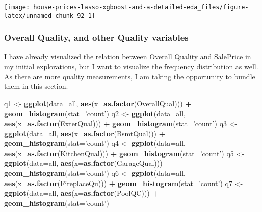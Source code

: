 \documentclass[]{article}
\newenvironment{Shaded}{\begin{snugshade}}{\end{snugshade}}
\newcommand{\KeywordTok}[1]{\textcolor[rgb]{0.13,0.29,0.53}{\textbf{#1}}}
\newcommand{\DataTypeTok}[1]{\textcolor[rgb]{0.13,0.29,0.53}{#1}}
\newcommand{\StringTok}[1]{\textcolor[rgb]{0.31,0.60,0.02}{#1}}
\newcommand{\OperatorTok}[1]{\textcolor[rgb]{0.81,0.36,0.00}{\textbf{#1}}}
\newcommand{\NormalTok}[1]{#1}
\begin{document}
\texttt{[image: house-prices-lasso-xgboost-and-a-detailed-eda\_files/figure-latex/unnamed-chunk-92-1]}

\subsubsection{Overall Quality, and other Quality
variables}\label{overall-quality-and-other-quality-variables}

I have already visualized the relation between Overall Quality and
SalePrice in my initial explorations, but I want to visualize the
frequency distribution as well. As there are more quality measurements,
I am taking the opportunity to bundle them in this section.

\begin{Shaded}
\begin{Highlighting}[]
\NormalTok{q1 <-}\StringTok{ }\KeywordTok{ggplot}\NormalTok{(}\DataTypeTok{data=}\NormalTok{all, }\KeywordTok{aes}\NormalTok{(}\DataTypeTok{x=}\KeywordTok{as.factor}\NormalTok{(OverallQual))) }\OperatorTok{+}
\StringTok{        }\KeywordTok{geom_histogram}\NormalTok{(}\DataTypeTok{stat=}\StringTok{'count'}\NormalTok{)}
\NormalTok{q2 <-}\StringTok{ }\KeywordTok{ggplot}\NormalTok{(}\DataTypeTok{data=}\NormalTok{all, }\KeywordTok{aes}\NormalTok{(}\DataTypeTok{x=}\KeywordTok{as.factor}\NormalTok{(ExterQual))) }\OperatorTok{+}
\StringTok{        }\KeywordTok{geom_histogram}\NormalTok{(}\DataTypeTok{stat=}\StringTok{'count'}\NormalTok{)}
\NormalTok{q3 <-}\StringTok{ }\KeywordTok{ggplot}\NormalTok{(}\DataTypeTok{data=}\NormalTok{all, }\KeywordTok{aes}\NormalTok{(}\DataTypeTok{x=}\KeywordTok{as.factor}\NormalTok{(BsmtQual))) }\OperatorTok{+}
\StringTok{        }\KeywordTok{geom_histogram}\NormalTok{(}\DataTypeTok{stat=}\StringTok{'count'}\NormalTok{)}
\NormalTok{q4 <-}\StringTok{ }\KeywordTok{ggplot}\NormalTok{(}\DataTypeTok{data=}\NormalTok{all, }\KeywordTok{aes}\NormalTok{(}\DataTypeTok{x=}\KeywordTok{as.factor}\NormalTok{(KitchenQual))) }\OperatorTok{+}
\StringTok{        }\KeywordTok{geom_histogram}\NormalTok{(}\DataTypeTok{stat=}\StringTok{'count'}\NormalTok{)}
\NormalTok{q5 <-}\StringTok{ }\KeywordTok{ggplot}\NormalTok{(}\DataTypeTok{data=}\NormalTok{all, }\KeywordTok{aes}\NormalTok{(}\DataTypeTok{x=}\KeywordTok{as.factor}\NormalTok{(GarageQual))) }\OperatorTok{+}
\StringTok{        }\KeywordTok{geom_histogram}\NormalTok{(}\DataTypeTok{stat=}\StringTok{'count'}\NormalTok{)}
\NormalTok{q6 <-}\StringTok{ }\KeywordTok{ggplot}\NormalTok{(}\DataTypeTok{data=}\NormalTok{all, }\KeywordTok{aes}\NormalTok{(}\DataTypeTok{x=}\KeywordTok{as.factor}\NormalTok{(FireplaceQu))) }\OperatorTok{+}
\StringTok{        }\KeywordTok{geom_histogram}\NormalTok{(}\DataTypeTok{stat=}\StringTok{'count'}\NormalTok{)}
\NormalTok{q7 <-}\StringTok{ }\KeywordTok{ggplot}\NormalTok{(}\DataTypeTok{data=}\NormalTok{all, }\KeywordTok{aes}\NormalTok{(}\DataTypeTok{x=}\KeywordTok{as.factor}\NormalTok{(PoolQC))) }\OperatorTok{+}
\StringTok{        }\KeywordTok{geom_histogram}\NormalTok{(}\DataTypeTok{stat=}\StringTok{'count'}\NormalTok{)}


\end{Highlighting}
\end{Shaded}
\end{document}
